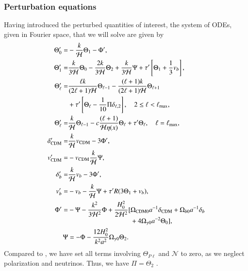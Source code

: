 \subsubsection{Perturbation equations}
Having introduced the perturbed quantities of interest, the system of ODEs, given in Fourier space, that we will solve are given by \cite[Eq. (22)]{callin} 
\begin{subequations} \label{eq:M3:theory:perturbation_ODEs}
    \begin{align}
        \Theta_0' =& - \frac{k}{\mathcal{H}}\Theta_1 - \Phi', \label{eq:M3:theory:perturbation_ODEs_Theta0}\\
        \Theta_1' =& \frac{k}{3\mathcal{H}}\Theta_0 - \frac{2k}{3\mathcal{H}}\Theta_2 + \frac{k}{3\mathcal{H}}\Psi + \tau' \left[ \Theta_1 + \frac{1}{3}v_b \right], \label{eq:M3:theory:perturbation_ODEs_Theta1} \\ 
        \Theta_\ell' =& \frac{\ell k}{(2\ell+1)\mathcal{H}}\Theta_{\ell-1} - \frac{(\ell+1)k}{(2\ell+1)\mathcal{H}}\Theta_{\ell+1} \nonumber \\
        & + \tau'\left[ \Theta_\ell - \frac{1}{10}\Pi \delta_{\ell,2} \right],\quad 2\leq\ell<\ell_\mathrm{max}, \label{eq:M3:theory:perturbation_ODEs_Theta_ell} \\
        \Theta_\ell' =& \frac{k}{\mathcal{H}}\Theta_{\ell-1} - c \frac{(\ell+1)}{\mathcal{H}\eta(x)}\Theta_{\ell} + \tau' \Theta_\ell,\quad \ell=\ell_\mathrm{max}, \label{eq:M3:theory:perturbation_ODEs_Theta_ell_max} \\
        \delta_\mathrm{CDM}' =& \frac{k}{\mathcal{H}} v_\mathrm{CDM} - 3\Phi', \label{eq:M3:theory:perturbation_ODEs_delta_cdm} \\
        v_\mathrm{CDM}' =& - v_\mathrm{CDM} \frac{k}{\mathcal{H}} \Psi, \label{eq:M3:theory:perturbation_ODEs_v_cdm} \\
        \delta_b' =& \frac{k}{\mathcal{H}} v_b - 3\Phi', \label{eq:M3:theory:perturbation_ODEs_delta_b} \\
        v_b' =& -v_b - \frac{k}{\mathcal{H}} \Psi + \tau' R(3\Theta_1 + v_b), \label{eq:M3:theory:perturbation_ODEs_v_b} \\
        \Phi' =& -\Psi - \frac{k^2}{3\mathcal{H}^2}\Phi + \frac{H_0^2}{2\mathcal{H}^2} \begin{aligned}[t]
            [&\Omega_\mathrm{CDM0} a^{-1}\delta_\mathrm{CDM} + \Omega_{b0} a^{-1} \delta_b \\
            &+4\Omega_{\gamma 0} a^{-2} \Theta_0], 
            \end{aligned} \label{eq:M3:theory:perturbation_ODEs_Phi} \\
        \Psi &= -\Phi - \frac{12H_0^2}{k^2 a^2} \Omega_{\gamma 0} \Theta_2. \label{eq:M3:theory:perturbation_ODEs_Psi}
    \end{align}
\end{subequations}
Compared to \cite[Eq. (22)]{callin}, we have set all terms involving $\Theta_{P\ell}$ and $\mathcal{N}$ to zero, as we neglect polarization and neutrinos. Thus, we have $\Pi=\Theta_2$ . 

